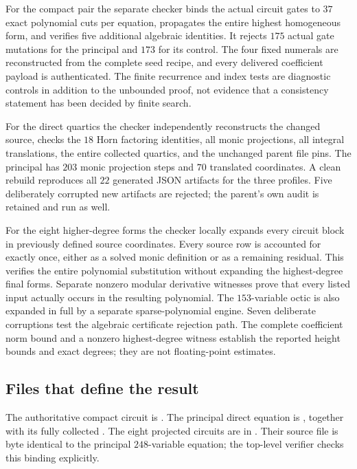 \documentclass[11pt,letterpaper]{article}
\theoremstyle{definition}
\theoremstyle{remark}
\begin{document}
For the compact pair the separate checker binds the actual circuit gates
to $37$ exact polynomial cuts per equation, propagates the entire highest
homogeneous form, and verifies five additional algebraic identities.
It rejects $175$ actual gate mutations for the principal and $173$ for its
control.  The four fixed numerals are reconstructed from the complete seed
recipe, and every delivered coefficient payload is authenticated.  The
finite recurrence and index tests are diagnostic controls in addition to
the unbounded proof, not evidence that a consistency statement has been
decided by finite search.

For the direct quartics the checker independently reconstructs the changed
source, checks the $18$ Horn factoring identities, all monic projections,
all integral translations, the entire collected quartics, and the unchanged
parent file pins.  The principal has $203$ monic projection steps and $70$
translated coordinates.  A clean rebuild reproduces all $22$ generated
JSON artifacts for the three profiles.  Five deliberately corrupted new
artifacts are rejected; the parent's own audit is retained and run as well.

For the eight higher-degree forms the checker locally expands every circuit
block in previously defined source coordinates.  Every source row is
accounted for exactly once, either as a solved monic definition or as a
remaining residual.  This verifies the entire polynomial substitution
without expanding the highest-degree final forms.  Separate nonzero modular
derivative witnesses prove that every listed input actually occurs in the
resulting polynomial.  The $153$-variable octic is also expanded in full by a
separate sparse-polynomial engine.  Seven deliberate corruptions test the
algebraic certificate rejection path.  The complete coefficient norm bound
and a nonzero highest-degree witness establish the reported height bounds
and exact degrees; they are not floating-point estimates.

\subsection{Files that define the result}

The authoritative compact circuit is
.  The principal direct equation is
, together with its
fully collected .  The eight projected
circuits are in .  Their source file is byte
identical to the principal $248$-variable equation; the top-level verifier
checks this binding explicitly.
\end{document}
